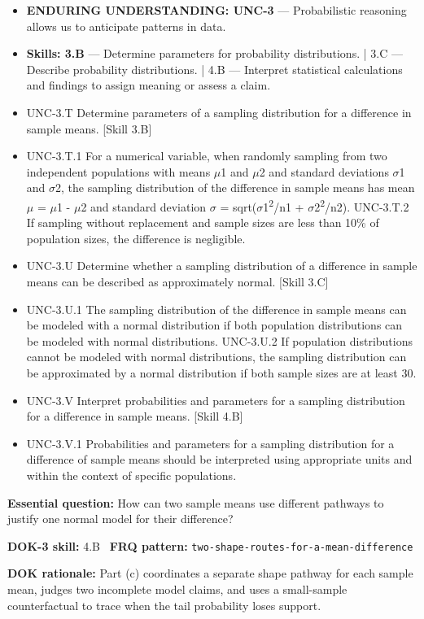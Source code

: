 \documentclass[11pt]{article}
\begin{document}


{\small
\begin{itemize}[leftmargin=1.5em,itemsep=2pt,topsep=2pt]
  \item \textbf{ENDURING UNDERSTANDING: UNC-3} --- Probabilistic reasoning allows us to anticipate patterns in data.
  \item \textbf{Skills: 3.B} --- Determine parameters for probability distributions. | 3.C --- Describe probability distributions. | 4.B --- Interpret statistical calculations and findings to assign meaning or assess a claim.
  \item UNC-3.T Determine parameters of a sampling distribution for a difference in sample means. [Skill 3.B]
  \item UNC-3.T.1 For a numerical variable, when randomly sampling from two independent populations with means $\mu$1 and $\mu$2 and standard deviations $\sigma$1 and $\sigma$2, the sampling distribution of the difference in sample means has mean $\mu$ = $\mu$1 - $\mu$2 and standard deviation $\sigma$ = sqrt($\sigma$1\textsuperscript{2}/n1 + $\sigma$2\textsuperscript{2}/n2). UNC-3.T.2 If sampling without replacement and sample sizes are less than 10\% of population sizes, the difference is negligible.
  \item UNC-3.U Determine whether a sampling distribution of a difference in sample means can be described as approximately normal. [Skill 3.C]
  \item UNC-3.U.1 The sampling distribution of the difference in sample means can be modeled with a normal distribution if both population distributions can be modeled with normal distributions. UNC-3.U.2 If population distributions cannot be modeled with normal distributions, the sampling distribution can be approximated by a normal distribution if both sample sizes are at least 30.
  \item UNC-3.V Interpret probabilities and parameters for a sampling distribution for a difference in sample means. [Skill 4.B]
  \item UNC-3.V.1 Probabilities and parameters for a sampling distribution for a difference of sample means should be interpreted using appropriate units and within the context of specific populations.
\end{itemize}
}
\textbf{Essential question:} How can two sample means use different pathways to justify one normal model for their difference?\par
\textbf{DOK-3 skill:} 4.B \textperiodcentered\ \textbf{FRQ pattern:} {\small\texttt{two-\allowbreak{}shape-\allowbreak{}routes-\allowbreak{}for-\allowbreak{}a-\allowbreak{}mean-\allowbreak{}difference}}\par
\textbf{DOK rationale:} Part (c) coordinates a separate shape pathway for each sample mean, judges two incomplete model claims, and uses a small-sample counterfactual to trace when the tail probability loses support.\par
\end{document}
